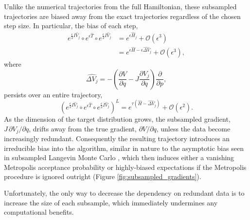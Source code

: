 \documentclass{article}
\begin{document}
Unlike the numerical trajectories from the full Hamiltonian, these subsampled 
trajectories are biased away from the exact trajectories regardless of the chosen step size.  
In particular, the bias of each step,
%
\begin{align*}
e^{\frac{\epsilon}{2} I \hat{V}_{j} } \circ 
e^{\epsilon \hat{T} } \circ 
e^{\frac{\epsilon}{2} I \hat{V}_{j} }
&=
e^{ \epsilon \hat{H}_{j} }
+ \mathcal{O} \! \left( \epsilon^{3} \right)
\\
&=
e^{ \epsilon \hat{H} - \epsilon \widehat{ \Delta V}_{j} }
+ \mathcal{O} \! \left( \epsilon^{3} \right),
\end{align*}
%
where
%
\begin{equation} \label{eqn:between_bias}
\widehat{ \Delta V_{j} } = 
- \left( \frac{ \partial V }{ \partial q } - J \frac{ \partial V_{j} }{ \partial q } \right)
\frac{ \partial }{ \partial p },
\end{equation}
%
persists over an entire trajectory,
%
\begin{equation*}
\left( e^{\frac{\epsilon}{2} I \hat{V}_{j} } \circ 
e^{\epsilon \hat{T} } \circ 
e^{\frac{\epsilon}{2} I \hat{V}_{j} } \right)^{L}
=
e^{ \tau \left( \hat{H} - \widehat{ \Delta V}_{j} \right) }
+ \mathcal{O} \! \left( \epsilon^{2} \right).
\end{equation*}
%
As the dimension of the target distribution grows, the subsampled gradient,
$J \, \partial V_{j} / \partial q $, drifts away from the true gradient, 
$\partial V / \partial q $, unless the data become increasingly redundant.
Consequently the resulting trajectory introduces an irreducible bias into
the algorithm, similar in nature to the asymptotic bias seen in subsampled
Langevin Monte Carlo \cite{TehEtAl:2014, VollmerEtAl:2015}, which then 
induces either a vanishing Metropolis acceptance probability 
or highly-biased expectations if the Metropolis procedure is ignored outright 
(Figure \ref{fig:subsampled_gradients}).  

Unfortunately, the only way to decrease the dependency on redundant data
is to increase the size of each subsample, which immediately undermines
any computational benefits.
\end{document}
